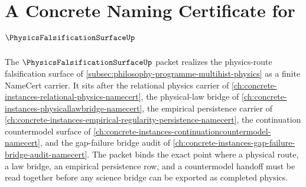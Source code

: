 \chapter{A Concrete Naming Certificate for $\PhysicsFalsificationSurfaceUp$}
\label{ch:concrete-instances-physics-falsification-surface-namecert}

The $\PhysicsFalsificationSurfaceUp$ packet realizes the physics-route falsification surface of \autoref{subsec:philosophy-programme-multihist-physics} as a finite NameCert carrier. It sits after the relational physics carrier of \autoref{ch:concrete-instances-relational-physics-namecert}, the physical-law bridge of \autoref{ch:concrete-instances-physicallawbridge-namecert}, the empirical persistence carrier of \autoref{ch:concrete-instances-empirical-regularity-persistence-namecert}, the continuation countermodel surface of \autoref{ch:concrete-instances-continuationcountermodel-namecert}, and the gap-failure bridge audit of \autoref{ch:concrete-instances-gap-failure-bridge-audit-namecert}. The packet binds the exact point where a physical route, a law bridge, an empirical persistence row, and a countermodel handoff must be read together before any science bridge can be exported as completed physics.

